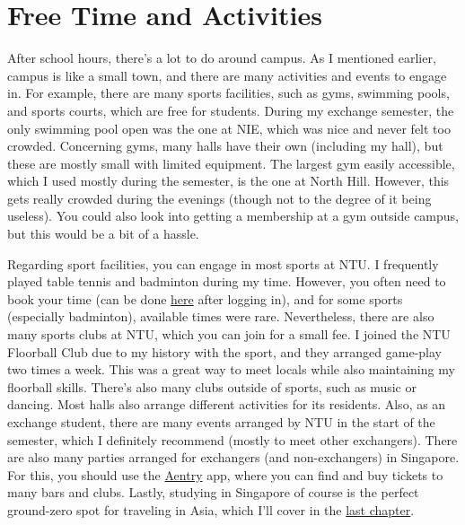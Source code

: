 \section*{Free Time and Activities}
{}
After school hours, there's a lot to do around campus. As I mentioned earlier, campus is like a small town, and there are many activities and events to engage in. For example, there are many sports facilities, such as gyms, swimming pools, and sports courts, which are free for students. During my exchange semester, the only swimming pool open was the one at NIE, which was nice and never felt too crowded. Concerning gyms, many halls have their own (including my hall), but these are mostly small with limited equipment. The largest gym easily accessible, which I used mostly during the semester, is the one at North Hill. However, this gets really crowded during the evenings (though not to the degree of it being useless). You could also look into getting a membership at a gym outside campus, but this would be a bit of a hassle. 

Regarding sport facilities, you can engage in most sports at NTU. I frequently played table tennis and badminton during my time. However, you often need to book your time (can be done \href{https://www.google.com/url?sa=t&source=web&rct=j&opi=89978449&url=https://ntu.facilitiesbooking.com/&ved=2ahUKEwi-k6Pays2LAxUg2TgGHZjtK4sQFnoECAsQAQ&usg=AOvVaw0UI5Z1OVQuEv2rAMKN2LGh}{here} after logging in), and for some sports (especially badminton), available times were rare. Nevertheless, there are also many sports clubs at NTU, which you can join for a small fee. I joined the NTU Floorball Club due to my history with the sport, and they arranged game-play two times a week. This was a great way to meet locals while also maintaining my floorball skills. There's also many clubs outside of sports, such as music or dancing. Most halls also arrange different activities for its residents. Also, as an exchange student, there are many events arranged by NTU in the start of the semester, which I definitely recommend (mostly to meet other exchangers). There are also many parties arranged for exchangers (and non-exchangers) in Singapore. For this, you should use the \href{https://aentry.app/events}{Aentry} app, where you can find and buy tickets to many bars and clubs. Lastly, studying in Singapore of course is the perfect ground-zero spot for traveling in Asia, which I'll cover in the \hyperref[discover]{last chapter}.

